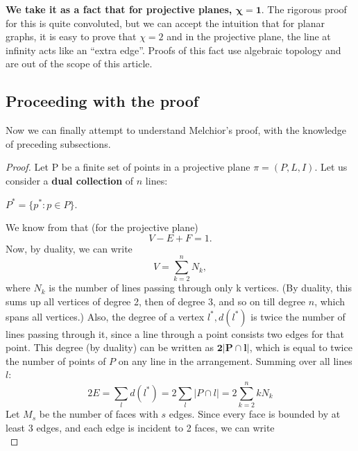\documentclass{article}
\begin{document}
\noindent \textbf{We take it as a fact that for projective planes, $\mathbf{\chi = 1.}$} The rigorous proof for this is quite convoluted, but we can accept the intuition that for planar graphs, it is easy to prove that $\chi = 2$ and in the projective plane, the line at infinity acts like an \enquote{extra edge}.\newline
Proofs of this fact use algebraic topology and are out of the scope of this article. \textbf{\Large{\textbf{\frownie{}}}}
\subsection{Proceeding with the proof}
Now we can finally attempt to understand Melchior's proof, with the knowledge of preceding subsections.\newline
\begin{proof}
    Let P be a finite set of points in a projective plane $\pi=(P,L,I)$. Let us consider a \textbf{dual collection} of $n$ lines:
    \begin{center}
        $P^* = \{p^* : p \in P\}$. 
    \end{center}
    We know from that (for the projective plane) 
    \begin{equation}
        V - E + F = 1.
    \end{equation}
    Now, by duality, we can write
    \begin{equation}
        V = \sum_{k=2}^{n} N_{k},  
    \end{equation}
    where $N_k$ is the number of lines passing through only k vertices. (By duality, this sums up all vertices of degree 2, then of degree 3, and so on till degree $n$, which spans all vertices.)
    \newline
    Also, the degree of a vertex $l^*, d(l^*)$ is twice the number of lines passing through it, since a line through a point consists two edges for that point. This degree (by duality) can be written as $\mathbf{2|P \cap l|}$, which is equal to twice the number of points of $P$ on any line in the arrangement.\newline
    Summing over all lines $l$:
    \begin{equation}
        2E = \sum_l d(l^*) = 2 \sum_l |P \cap l| = 2 \sum_{k=2}^{n} kN_k
    \end{equation}
    Let $M_s$ be the number of faces with $s$ edges. Since every face is bounded by at least 3 edges, and each edge is incident to 2 faces, we can write
    \begin{equation}

\end{equation}
\end{proof}
\end{document}
